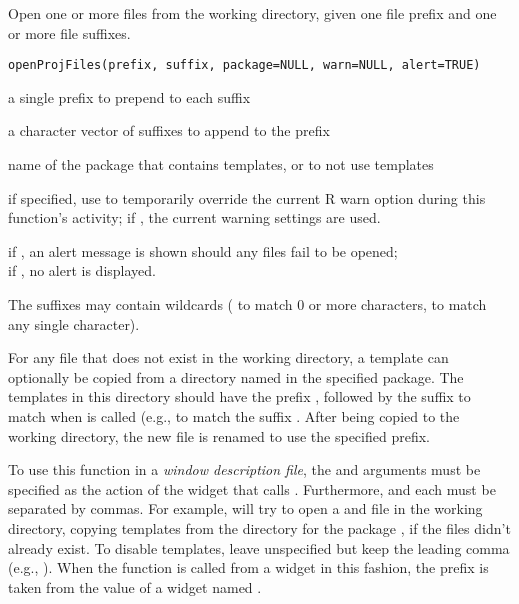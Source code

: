 \documentclass[letterpaper]{book}
\begin{document}
\begin{Description}\relax
Open one or more files from the working directory, given one 
file prefix and one or more file suffixes.
\end{Description}
\begin{Usage}
\begin{verbatim}
openProjFiles(prefix, suffix, package=NULL, warn=NULL, alert=TRUE)
\end{verbatim}
\end{Usage}
\begin{Arguments}
\begin{ldescription}
\item[\code{prefix}] a single prefix to prepend to each suffix
\item[\code{suffix}] a character vector of suffixes to append to the prefix
\item[\code{package}] name of the package that contains templates,
or  to not use templates
\item[\code{warn}] if specified, use to temporarily override the 
current R warn option during this function's activity; 
if , the current warning settings are used.
\item[\code{alert}] if , an alert message is shown should 
any files fail to be opened; \\ if , no alert is displayed.
\end{ldescription}
\end{Arguments}
\begin{Details}\relax
The suffixes may contain wildcards ( to match 0 or more 
characters,  to match any single character).

For any file that does not exist in the working directory, a template can
optionally be copied from a directory named  in the specified
package. The templates in this directory should have the prefix ,
followed by the suffix to match when  is called
(e.g.,  to match the suffix . After being copied 
to the working directory, the new file is renamed to use the specified prefix.

To use this function in a \emph{window description file}, the
 and  arguments must be specified as the action of the widget
that calls . Furthermore,  and each  must be
separated by commas. For example,  will try to open a 
and  file in the working directory, copying templates from the 
directory for the package , if the files didn't already exist. To
disable templates, leave  unspecified but keep the leading comma
(e.g., ). When the function is called from a widget in this
fashion, the prefix is taken from the value of a widget named .
\end{Details}
\end{document}
